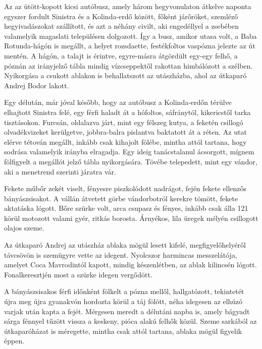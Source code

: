 \documentclass{IEEEtran}
\begin{document}
Az az ütött-kopott kicsi autóbusz, amely három hegyvonulaton átkelve naponta
egyszer fordult Sinistra és a Kolinda-erdő között, főként járőröket, szemléző
hegyivadászokat szállított, és azt a néhány civilt, aki engedéllyel a zsebében
valamelyik magaslati településen dolgozott. Így a busz, amikor utasa volt, a
Baba Rotunda-hágón is megállt, a helyet rozsdaette, festékfoltos vaspózna
jelezte az út mentén. A hágón, a talajt is érintve, egyre-másra átgördült
egy-egy felhő, a póznán az irányjelző tábla mindig vízcseppektől rakottan
himbálózott a szélben. Nyikorgása a csukott ablakon is behallatszott az
utászházba, ahol az útkaparó Andrej Bodor lakott.

Egy délután, már jóval később, hogy az autóbusz a Kolinda-erdőn térülve
elhajtott Sinistra felé, egy férfi haladt át a hófoltos, sáfránytól,
kikericstől tarka tisztásokon. Furcsán, oldalazva járt, mint egy félszeg
kutya, a feketén csillogó olvadékvizeket kerülgetve, jobbra-balra pislantva
baktatott át a réten. Az utat elérve tétován megállt, inkább csak kihajolt
fölébe, mintha attól tartana, hogy sodrása valamelyik irányba elragadja. Egy
ideig tanácstalanul ácsorgott, mígnem fölfigyelt a megállót jelző tábla
nyikorgására. Tövébe telepedett, mint egy vándor, aki a menetrend szerinti
járatra vár.

Fekete műbőr zekét viselt, fényesre piszkolódott nadrágot, fején fekete
ellenzős bányászsisakot. A vállán átvetett görbe vándorbotról kerekre tömött,
fekete aktatáska lógott. Bőre szürke volt, arca csupasz és fényes, inkább csak
álla 121 körül motozott valami gyér, ritkás borosta. Árnyékos, lila üregek
mélyén csillogott olajos szeme.

Az útkaparó Andrej az utászház ablaka mögül lesett kifelé, megfigyelőhelyéről
távcsövön is szemügyre vette az idegent. Nyolcszor harmincas messzelátója,
amelyet Coca Mavrodintól kapott, mindig készenlétben, az ablak kilincsén
lógott. Fonalkeresztjén most a szürke idegen vergődött.

A bányászsisakos férfi időnként fölkelt a pózna mellől, hallgatózott,
tekintetét újra meg újra gyanakvón hordozta körül a táj fölött, néha idegesen
az elhúzó varjak után kapta a fejét. Mérgesen meredt a délutáni napba is,
amely bágyadt sárga fénnyel tűzött vissza a keskeny, pióca alakú felhők közül.
Szeme sarkából az útkaparóházat is méregette, mintha csak attól tartana,
ablaka mögül figyelik éppen.
\end{document}
